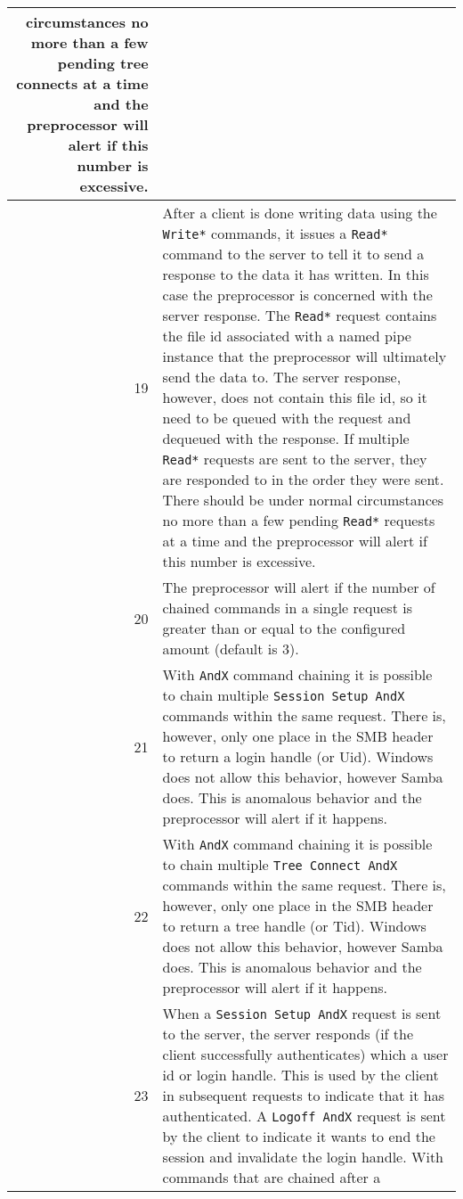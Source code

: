 \documentclass[english]{report}
\begin{document}
\begin{itemize}
\begin{longtable}{|r|p{13.5cm}|}
      circumstances no more than a few pending tree connects at a time and
      the preprocessor will alert if this number is excessive.\\
\hline
 19 & After a client is done writing data using the \texttt{Write*} commands,
      it issues a \texttt{Read*} command to the server to tell it to send a
      response to the data it has written. In this case the preprocessor is
      concerned with the server response. The \texttt{Read*} request contains
      the file id associated with a named pipe instance that the preprocessor
      will ultimately send the data to. The server response, however, does not
      contain this file id, so it need to be queued with the request and
      dequeued with the response. If multiple \texttt{Read*} requests are sent
      to the server, they are responded to in the order they were sent. There
      should be under normal circumstances no more than a few pending
      \texttt{Read*} requests at a time and the preprocessor will alert if this
      number is excessive.\\
\hline
 20 & The preprocessor will alert if the number of chained commands in a
      single request is greater than or equal to the configured amount
      (default is 3).\\
\hline
 21 & With \texttt{AndX} command chaining it is possible to chain multiple
      \texttt{Session Setup AndX} commands within the same request. There is,
      however, only one place in the SMB header to return a login handle
      (or Uid).  Windows does not allow this behavior, however Samba does. This
      is anomalous behavior and the preprocessor will alert if it happens.\\
\hline
 22 & With \texttt{AndX} command chaining it is possible to chain multiple
      \texttt{Tree Connect AndX} commands within the same request. There is,
      however, only one place in the SMB header to return a tree handle
      (or Tid).  Windows does not allow this behavior, however Samba does. This
      is anomalous behavior and the preprocessor will alert if it happens.\\
\hline
 23 & When a \texttt{Session Setup AndX} request is sent to the server, the
      server responds (if the client successfully authenticates) which a user
      id or login handle. This is used by the client in subsequent requests to
      indicate that it has authenticated. A \texttt{Logoff AndX} request is
      sent by the client to indicate it wants to end the session and invalidate
      the login handle. With commands that are chained after a

\end{longtable}
\end{itemize}
\end{document}
